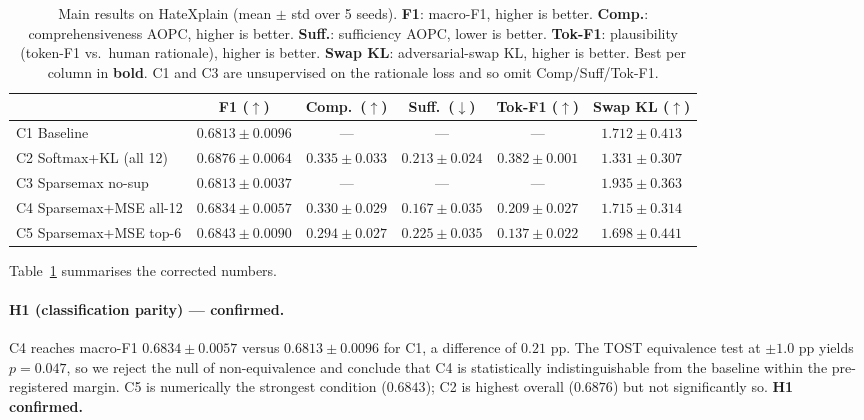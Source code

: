 \documentclass{article}
\begin{document}
\begin{table}[t]
\centering
\caption{Main results on HateXplain (mean $\pm$ std over 5 seeds). \textbf{F1}: macro-F1,
higher is better. \textbf{Comp.}: comprehensiveness AOPC, higher is better.
\textbf{Suff.}: sufficiency AOPC, lower is better. \textbf{Tok-F1}: plausibility
(token-F1 vs.\ human rationale), higher is better. \textbf{Swap KL}: adversarial-swap KL,
higher is better. Best per column in \textbf{bold}. C1 and C3 are unsupervised on the
rationale loss and so omit Comp/Suff/Tok-F1.}
\label{tab:main_results}
\small
\begin{tabular}{lccccc}
\toprule
& \textbf{F1 ($\uparrow$)} & \textbf{Comp.\ ($\uparrow$)} & \textbf{Suff.\ ($\downarrow$)} & \textbf{Tok-F1 ($\uparrow$)} & \textbf{Swap KL ($\uparrow$)} \\
\midrule
C1 Baseline                  & $0.6813 \pm 0.0096$ & ---                 & ---                 & ---                 & $1.712 \pm 0.413$ \\
C2 Softmax+KL (all 12)       & $0.6876 \pm 0.0064$ & $\mathbf{0.335 \pm 0.033}$ & $0.213 \pm 0.024$ & $\mathbf{0.382 \pm 0.001}$ & $1.331 \pm 0.307$ \\
C3 Sparsemax no-sup          & $0.6813 \pm 0.0037$ & ---                 & ---                 & ---                 & $\mathbf{1.935 \pm 0.363}$ \\
C4 Sparsemax+MSE all-12      & $0.6834 \pm 0.0057$ & $0.330 \pm 0.029$   & $\mathbf{0.167 \pm 0.035}$ & $0.209 \pm 0.027$ & $1.715 \pm 0.314$ \\
C5 Sparsemax+MSE top-6       & $\mathbf{0.6843 \pm 0.0090}$ & $0.294 \pm 0.027$ & $0.225 \pm 0.035$ & $0.137 \pm 0.022$ & $1.698 \pm 0.441$ \\
\bottomrule
\end{tabular}
\end{table}

Table~\ref{tab:main_results} summarises the corrected numbers.

\paragraph{H1 (classification parity) --- confirmed.} C4 reaches macro-F1
$0.6834 \pm 0.0057$ versus $0.6813 \pm 0.0096$ for C1, a difference of $0.21$ pp. The
TOST equivalence test at $\pm 1.0$ pp yields $p{=}0.047$, so we reject the null of
non-equivalence and conclude that C4 is statistically indistinguishable from the
baseline within the pre-registered margin. C5 is numerically the strongest condition
($0.6843$); C2 is highest overall ($0.6876$) but not significantly so. \textbf{H1
confirmed.}
\end{document}
